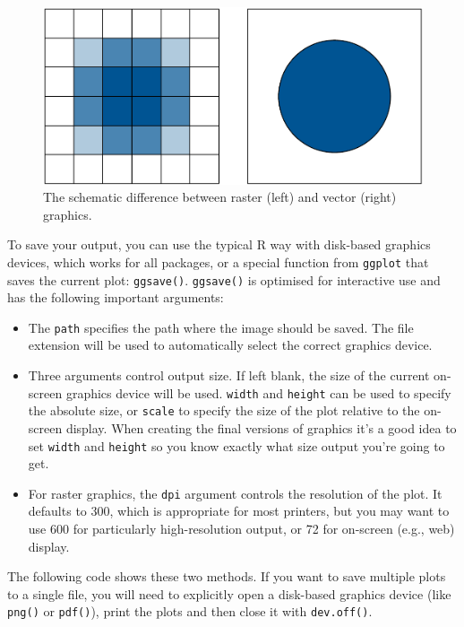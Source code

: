 \begin{figure}[htbp]
  \centering
    \includegraphics[width= 0.5\linewidth]{diagrams/vector-raster}
  \caption{The schematic difference between raster (left) and vector (right) graphics. }
  \label{fig:vector-raster}
\end{figure}

To save your output, you can use the typical R way with disk-based
graphics devices, which works for all packages, or a special function
from \texttt{ggplot} that saves the current plot: \texttt{ggsave()}.
\texttt{ggsave()} is optimised for interactive use and has the following
important arguments: 

\begin{itemize}
\itemsep1pt\parskip0pt
\item
  The \texttt{path} specifies the path where the image should be saved.
  The file extension will be used to automatically select the correct
  graphics device.
\item
  Three arguments control output size. If left blank, the size of the
  current on-screen graphics device will be used. \texttt{width} and
  \texttt{height} can be used to specify the absolute size, or
  \texttt{scale} to specify the size of the plot relative to the
  on-screen display. When creating the final versions of graphics it's a
  good idea to set \texttt{width} and \texttt{height} so you know
  exactly what size output you're going to get.
\item
  For raster graphics, the \texttt{dpi} argument controls the resolution
  of the plot. It defaults to 300, which is appropriate for most
  printers, but you may want to use 600 for particularly high-resolution
  output, or 72 for on-screen (e.g., web) display.
\end{itemize}

The following code shows these two methods. If you want to save multiple
plots to a single file, you will need to explicitly open a disk-based
graphics device (like \texttt{png()} or \texttt{pdf()}), print the plots
and then close it with \texttt{dev.off()}.


